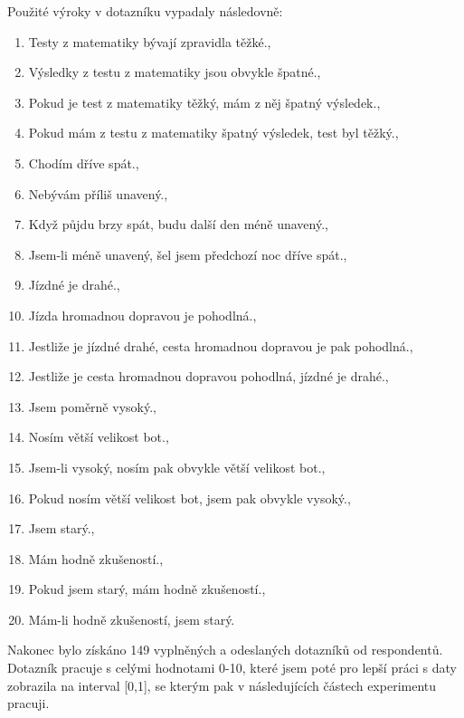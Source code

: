 Použité výroky v dotazníku vypadaly následovně:
\begin{enumerate}
       \item  \clqq Testy z matematiky bývají zpravidla těžké.\crqq  , 
       \item  \clqq Výsledky z testu z matematiky jsou obvykle špatné.\crqq  ,
       \item  \clqq Pokud je test z matematiky těžký, mám z něj špatný výsledek.\crqq  ,
       \item  \clqq Pokud mám z testu z matematiky špatný výsledek, test byl těžký.\crqq  ,
       \item  \clqq Chodím dříve spát.\crqq  ,
       \item  \clqq Nebývám příliš unavený.\crqq  ,
       \item  \clqq Když půjdu brzy spát, budu další den méně unavený.\crqq  ,
       \item  \clqq Jsem-li méně unavený, šel jsem předchozí noc dříve spát.\crqq  ,
       \item  \clqq Jízdné je drahé.\crqq  ,
       \item  \clqq Jízda hromadnou dopravou je pohodlná.\crqq  ,
       \item  \clqq Jestliže je jízdné drahé, cesta hromadnou dopravou je pak pohodlná.\crqq,
       \item  \clqq Jestliže je cesta hromadnou dopravou pohodlná, jízdné je drahé.\crqq  ,
       \item  \clqq Jsem poměrně vysoký.\crqq  ,
       \item  \clqq Nosím větší velikost bot.\crqq  ,
       \item  \clqq Jsem-li vysoký, nosím pak obvykle větší velikost bot.\crqq  ,
       \item  \clqq Pokud nosím větší velikost bot, jsem pak obvykle vysoký.\crqq  ,
       \item  \clqq Jsem starý.\crqq,
       \item  \clqq Mám hodně zkušeností.\crqq,
       \item  \clqq Pokud jsem starý, mám hodně zkušeností.\crqq,
       \item  \clqq Mám-li hodně zkušeností, jsem starý.\crqq 
\end{enumerate}

Nakonec bylo získáno 149 vyplněných a odeslaných dotazník\r u od respondent\r u. Dotazník pracuje s celými hodnotami 0-10, které jsem poté pro lepší práci s daty zobrazila na interval [0,1], se kterým pak v následujících částech experimentu pracuji.

